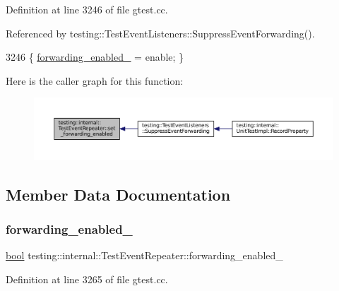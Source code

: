 Definition at line 3246 of file gtest.\+cc.



Referenced by testing\+::\+Test\+Event\+Listeners\+::\+Suppress\+Event\+Forwarding().


\begin{DoxyCode}
3246 \{ \hyperlink{classtesting_1_1internal_1_1TestEventRepeater_a1f7e494642d653eaad800504510d18a3}{forwarding\_enabled\_} = enable; \}
\end{DoxyCode}
Here is the caller graph for this function\+:
\nopagebreak
\begin{figure}[H]
\begin{center}
\leavevmode
\includegraphics[width=350pt]{classtesting_1_1internal_1_1TestEventRepeater_a86c52e311b70598a385a0589277e92e0_icgraph}
\end{center}
\end{figure}


\subsection{Member Data Documentation}
\mbox{\label{classtesting_1_1internal_1_1TestEventRepeater_a1f7e494642d653eaad800504510d18a3}} 
\subsubsection{\texorpdfstring{forwarding\+\_\+enabled\+\_\+}{forwarding\_enabled\_}}
{\footnotesize\ttfamily \hyperlink{classbool}{bool} testing\+::internal\+::\+Test\+Event\+Repeater\+::forwarding\+\_\+enabled\+\_\+\hspace{0.3cm}{\ttfamily [private]}}



Definition at line 3265 of file gtest.\+cc.

\mbox{\label{classtesting_1_1internal_1_1TestEventRepeater_a1c08e9302639108588d764b671c54825}} 

